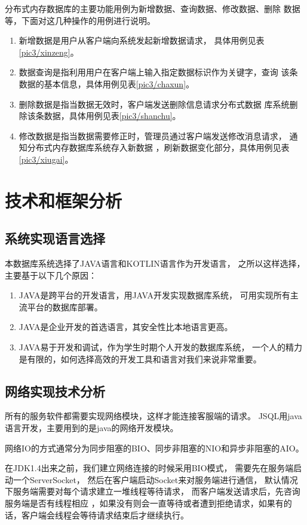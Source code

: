 分布式内存数据库的主要功能用例为新增数据、查询数据、修改数据、删除
数据等，下面对这几种操作的用例进行说明。
\begin{enumerate}
	\item 新增数据是用户从客户端向系统发起新增数据请求，
	具体用例见表\ref{pic3/xinzeng}。
	\item 数据查询是指利用用户在客户端上输入指定数据标识作为关键字，查询
	该条数据的基本信息，具体用例见表\ref{pic3/chaxun}。
\item 	删除数据是指当数据无效时，客户端发送删除信息请求分布式数据
	库系统删除该条数据，具体用例见表\ref{pic3/shanchu}。
\item 	修改数据是指当数据需要修正时，管理员通过客户端发送修改消息请求，
	通知分布式内存数据库系统存入新数据
	，刷新数据变化部分，具体用例见表\ref{pic3/xiugai}。
\end{enumerate}
\section{技术和框架分析}
\subsection{系统实现语言选择}
本数据库系统选择了JAVA语言和KOTLIN语言作为开发语言，
之所以这样选择，主要基于以下几个原因：
\begin{enumerate}
	\item JAVA是跨平台的开发语言，用JAVA开发实现数据库系统，
	可用实现所有主流平台的数据库部署。
	\item JAVA是企业开发的首选语言，其安全性比本地语言更高。
	\item JAVA易于开发和调试，作为学生时期个人开发的数据库系统，
	一个人的精力是有限的，如何选择高效的开发工具和语言对我们来说非常重要。
\end{enumerate}
\subsection{网络实现技术分析}
所有的服务软件都需要实现网络模块，这样才能连接客服端的请求。
JSQL用java语言开发，主要用到的是java的网络开发模块。

网络IO的方式通常分为同步阻塞的BIO、同步非阻塞的NIO和异步非阻塞的AIO。

在JDK1.4出来之前，我们建立网络连接的时候采用BIO模式，
需要先在服务端启动一个ServerSocket，
然后在客户端启动Socket来对服务端进行通信，
默认情况下服务端需要对每个请求建立一堆线程等待请求，
而客户端发送请求后，先咨询服务端是否有线程相应
，如果没有则会一直等待或者遭到拒绝请求，如果有的话，客户端会线程会等待请求结束后才继续执行。

